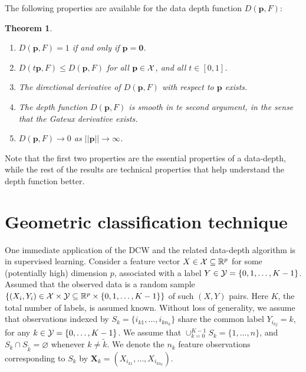 \documentclass[twoside]{article}
\newtheorem{Theorem}{Theorem}[section]
\begin{document}
 
The following properties are available for the data depth function $D (\mathbf{p}, F)$:
\begin{Theorem} 
\begin{enumerate}
\item $D (\mathbf{p}, F)  = 1$ if and only if $\mathbf{p} = \mathbf{0}$. 
\item $D ( t \mathbf{p}, F) \leq D (\mathbf{p}, F)$ for all $\mathbf{p} \in {\cal{X}}$, 
and all $t \in [0,1]$. 
\item The directional derivative of $D (\mathbf{p}, F)$ with respect to 
$\mathbf{p}$ exists. 
\item The depth function $D (\mathbf{p}, F)$ is smooth in te second argument, in the sense 
that the Gateux derivative exists.
\item $D (\mathbf{p}, F) \rightarrow 0$ as $|| \mathbf{p} || \rightarrow \infty$. 
\end{enumerate}
\end{Theorem}
Note that the first two properties are the essential properties of a data-depth, while 
the rest of the results are technical properties that help understand the depth function 
better. 
 
 
 

 
 \section{Geometric classification technique}
\label{sec:GLA}

One immediate application of the DCW  and the related data-depth algorithm 
is in supervised learning. 
Consider a feature vector $X \in {\cal{X}} \subseteq \mathbb{R}^{p}$ for some 
(potentially high) dimension $p$, associated with a label 
$Y \in {\cal{Y}} = \{ 0, 1, \ldots, K-1 \}$. Assumed that the observed data is a 
random sample 
$\{ (X_{i}, Y_{i}) \in {\cal{X}} \times {\cal{Y}} 
 \subseteq \mathbb{R}^{p} \times \{ 0, 1, \ldots, 
K - 1 \} \}$ of such $(X, Y)$ pairs. Here $K$, the total number of labels, is 
assumed known. Without loss of generality, we assume that
observations indexed by $S_{k} = \{ i_{k 1}, \ldots, i_{k {n_{k}}} \}$ share the common
label $Y_{i_{k j}} = k$, for any $k \in {\cal{Y}} = \{ 0, \ldots, K-1 \}$. We assume
that $\cup_{k = 0}^{ K - 1} S_{k} = \{ 1, \ldots, n \}$, and 
$S_{k} \cap S_{\tilde{k}} = \varnothing$ whenever $k \ne \tilde{k}$. We denote the 
$n_{k}$ feature observations corresponding to $S_{k}$ by  
$\mathbf{X}_{k} = (X_{i_{k 1}}, \ldots, X_{i_{k n_{k}}})$.
\end{document}
